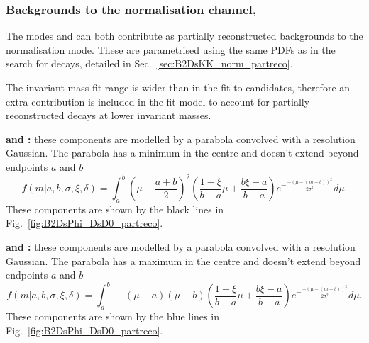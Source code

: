 \subsubsection{Backgrounds to the normalisation channel, \decay{\Bp}{\Dsp\Dzb}}

The modes \decay{\Bp}{\Dsp\Dstarzb} and \decay{\Bp}{\Dssp\Dzb} can both contribute as partially reconstructed backgrounds to the \decay{\Bp}{\Dsp\Dzb} normalisation mode. These are parametrised using the same PDFs as in the search for \decay{\Bp}{\Ds\Kp\Km} decays, detailed in Sec.~\ref{sec:B2DsKK_norm_partreco}. 

The invariant mass fit range is wider than in the fit to \decay{\Bp}{\Dsp\Kp\Km} candidates, therefore an extra contribution is included in the fit model to account for partially reconstructed \decay{\Bp}{\Dssp\Dstarzb} decays at lower invariant masses.

\begin{description}
\item \textbf{\decay{\Bp}{(\decay{\Dssp}{\Dsp[\piz]})\Dzb} and \decay{\Bp}{\Dsp(\decay{\Dstarzb}{\Dzb[\piz]})}:} these components are modelled by a parabola convolved with a resolution Gaussian. The parabola has a minimum in the centre and doesn't extend beyond endpoints $a$ and $b$
\begin{equation}
f(m|a,b,\sigma,\xi, \delta) = \int_{a}^{b}\left(\mu-\frac{a+b}{2}\right)^{2} \left( \frac{1-\xi}{b-a}\mu + \frac{b\xi-a}{b-a} \right) e^{-\frac{-(\mu-(m-\delta))^{2}}{2\sigma^{2}}} d\mu.
\label{eq:DsPhi_RooHorns}
\end{equation}
These components are shown by the black lines in Fig.~\ref{fig:B2DsPhi_DsD0_partreco}.

\item \textbf{\decay{\Bp}{(\decay{\Dssp}{\Dsp[\Pgamma]})\Dzb} and \decay{\Bp}{\Dsp(\decay{\Dstarzb}{\Dzb[\Pgamma]})}:} these components are modelled by a parabola convolved with a resolution Gaussian. The parabola has a maximum in the centre and doesn't extend beyond endpoints $a$ and $b$
\begin{equation}
f(m|a,b,\sigma,\xi, \delta) = \int_{a}^{b} -(\mu-a)(\mu-b)\left( \frac{1-\xi}{b-a}\mu + \frac{b\xi-a}{b-a} \right) e^{-\frac{-(\mu-(m-\delta))^{2}}{2\sigma^{2}}} d\mu.
\label{eq:DsPhi_RooHills}
\end{equation}
These components are shown by the blue lines in Fig.~\ref{fig:B2DsPhi_DsD0_partreco}.
\end{description}

